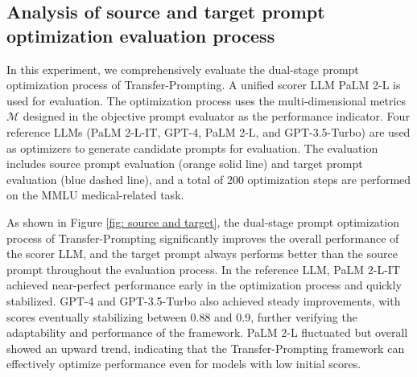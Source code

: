 \subsection{Analysis of source and target prompt optimization evaluation process}
In this experiment, we comprehensively evaluate the dual-stage prompt optimization process of Transfer-Prompting. A unified scorer LLM PaLM 2-L is used for evaluation. The optimization process uses the multi-dimensional metrics $\mathcal{M}$ designed in the objective prompt evaluator as the performance indicator. Four reference LLMs (PaLM 2-L-IT, GPT-4, PaLM 2-L, and GPT-3.5-Turbo) are used as optimizers to generate candidate prompts for evaluation. The evaluation includes source prompt evaluation (orange solid line) and target prompt evaluation (blue dashed line), and a total of 200 optimization steps are performed on the MMLU medical-related task.

As shown in Figure \ref{fig: source and target}, the dual-stage prompt optimization process of Transfer-Prompting significantly improves the overall performance of the scorer LLM, and the target prompt always performs better than the source prompt throughout the evaluation process. In the reference LLM, PaLM 2-L-IT achieved near-perfect performance early in the optimization process and quickly stabilized. GPT-4 and GPT-3.5-Turbo also achieved steady improvements, with scores eventually stabilizing between 0.88 and 0.9, further verifying the adaptability and performance of the framework. PaLM 2-L fluctuated but overall showed an upward trend, indicating that the Transfer-Prompting framework can effectively optimize performance even for models with low initial scores.





